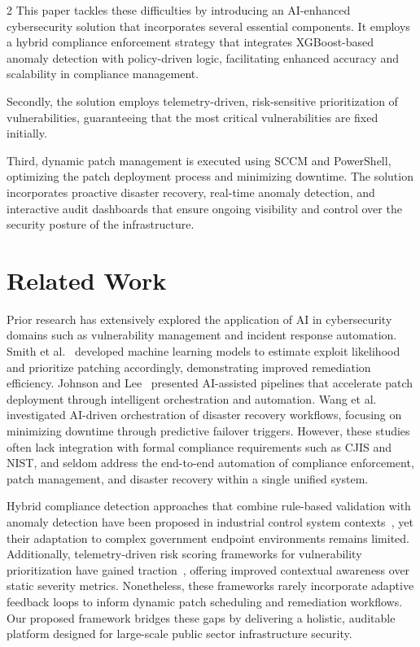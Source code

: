 \documentclass[10pt]{article} %
\begin{document}
\begin{multicols}{2}
\indent This paper tackles these difficulties by introducing an AI-enhanced cybersecurity solution that incorporates several essential components.  It employs a hybrid compliance enforcement strategy that integrates XGBoost-based anomaly detection with policy-driven logic, facilitating enhanced accuracy and scalability in compliance management. 

\indent
Secondly, the solution employs telemetry-driven, risk-sensitive prioritization of vulnerabilities, guaranteeing that the most critical vulnerabilities are fixed initially. 

\indent Third, dynamic patch management is executed using SCCM and PowerShell, optimizing the patch deployment process and minimizing downtime.  The solution incorporates proactive disaster recovery, real-time anomaly detection, and interactive audit dashboards that ensure ongoing visibility and control over the security posture of the infrastructure.


\section{Related Work}

Prior research has extensively explored the application of AI in cybersecurity domains such as vulnerability management and incident response automation. Smith et al.~\cite{smith2023ml} developed machine learning models to estimate exploit likelihood and prioritize patching accordingly, demonstrating improved remediation efficiency. Johnson and Lee~\cite{johnson2022ai} presented AI-assisted pipelines that accelerate patch deployment through intelligent orchestration and automation. Wang et al.~\cite{wang2021disaster} investigated AI-driven orchestration of disaster recovery workflows, focusing on minimizing downtime through predictive failover triggers. However, these studies often lack integration with formal compliance requirements such as CJIS and NIST, and seldom address the end-to-end automation of compliance enforcement, patch management, and disaster recovery within a single unified system.

Hybrid compliance detection approaches that combine rule-based validation with anomaly detection have been proposed in industrial control system contexts~\cite{brown2020hybrid}, yet their adaptation to complex government endpoint environments remains limited. Additionally, telemetry-driven risk scoring frameworks for vulnerability prioritization have gained traction~\cite{lee2021telemetry}, offering improved contextual awareness over static severity metrics. Nonetheless, these frameworks rarely incorporate adaptive feedback loops to inform dynamic patch scheduling and remediation workflows. Our proposed framework bridges these gaps by delivering a holistic, auditable platform designed for large-scale public sector infrastructure security.


\end{multicols}
\end{document}
